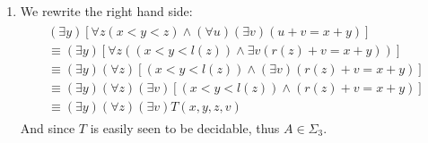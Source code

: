 \begin{enumerate}[label=]
    \item
        We rewrite the right hand side:
        \begin{align*}
            \begin{split}
                (\exists y)[\forall z(x < y < z) \wedge (\forall u)(\exists v)(u + v = x + y)] \\ \equiv 
                (\exists y)[\forall z ((x < y < l(z)) \wedge \exists v(r(z) + v = x + y))]  \\
                \equiv (\exists y)(\forall z) [(x < y < l(z)) \wedge (\exists v)(r(z) + v = x + y)] \\
                \equiv (\exists y)(\forall z) (\exists v) [(x < y < l(z)) \wedge (r(z) + v = x + y)] \\
                \equiv (\exists y)(\forall z) (\exists v) T(x, y, z, v)
            \end{split}
        \end{align*}
        And since $T$ is easily seen to be decidable, thus $A \in \Sigma_3$.
\end{enumerate}